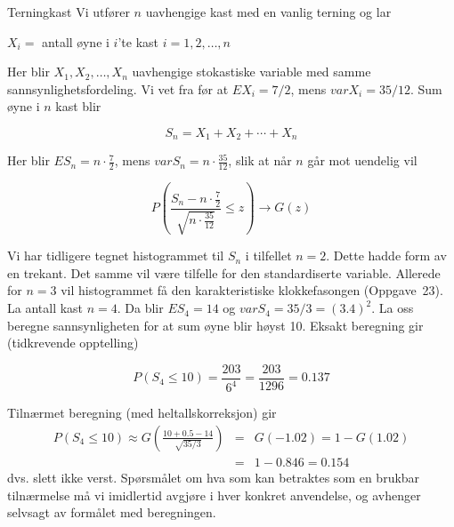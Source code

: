 \begin{eksempel}{Terningkast}
Vi utfører $n$ uavhengige kast med en vanlig terning og lar 

\begin{center}
     $X_i =$ antall øyne i $i$'te kast $i=1,2,\ldots ,n$
\end{center}
\noindent Her blir $X_1, X_2, \ldots , X_n$ uavhengige stokastiske variable med
samme sannsynlighetsfordeling. Vi vet fra før at $EX_i =7/2$, mens
$varX_i =35/12$. Sum øyne i $n$ kast blir

\[ S_n =X_1+X_2+\cdots +X_n \]

\noindent Her blir $ES_n=n\cdot \frac{7}{2}$,
 mens $varS_n=n\cdot \frac{35}{12}$,
slik at når $n$ går mot uendelig vil

\[  P(\frac{S_n-n \cdot \frac{7}{2}}{\sqrt{n \cdot \frac{35}{12}}} \leq z)
                      \rightarrow G(z) \]

\noindent Vi har tidligere tegnet histogrammet til $S_n$ i tilfellet $n=2$.
Dette hadde form av en trekant. Det samme vil være tilfelle for
den standardiserte variable. Allerede for $n=3$ vil histogrammet
få den karakteristiske klokkefasongen (Oppgave~23).
La antall kast $n=4$. Da blir $ES_4=14$ og $varS_4=35/3={(3.4)}^2$.
La oss beregne sannsynligheten for at sum øyne blir høyst 10.
Eksakt beregning gir (tidkrevende opptelling)

\[ P(S_4 \leq 10)=\frac{203}{6^4}=\frac{203}{1296}=0.137 \]

\noindent Tilnærmet beregning (med heltallskorreksjon) gir
\begin{eqnarray*}
P(S_4 \leq 10) \approx G(\frac{10+0.5-14}{\sqrt{35/3}})&=&G(-1.02)=1-G(1.02) \\
                   &=&1-0.846=0.154
\end{eqnarray*}
\noindent dvs. slett ikke verst. Spørsmålet om hva som kan betraktes
 som en brukbar tilnærmelse må vi imidlertid avgjøre i hver konkret
anvendelse, og avhenger selvsagt av formålet med beregningen. \\
\end{eksempel}

